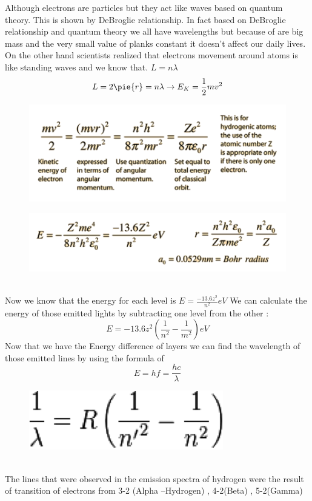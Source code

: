 \documentclass{article}
\begin{document}
Although electrons are particles but they act like waves based on quantum theory. This is shown by DeBroglie relationship. In fact based on DeBroglie relationship and quantum theory we all have wavelengths but because of are big mass and the very small value of planks constant it doesn’t affect our daily lives. \\

On the other hand scientists realized that electrons movement around atoms is like standing waves and we know that. $L=n\lambda$\\
\begin{equation}
    L=2\pie{r}=n\lambda \rightarrow E_{K}=\frac{1}{2}mv^{2}
\end{equation}
\begin{figure}[h!]
    \centering
    \includegraphics{E1.png}
\end{figure}
\begin{figure}[h!]
    \centering
    \includegraphics{E2.png}
\end{figure}\\
Now we know that the energy for each level is $E=\frac{-13.6z^{2}}{n^{2}}eV$ We can calculate the energy of those emitted lights by subtracting one level from the other :\\
\begin{equation}
    E=-13.6z^{2}(\frac{1}{n^{2}}-\frac{1}{m^{2}}) eV
\end{equation}
Now that we have the Energy difference of layers we can find the wavelength of those emitted lines by using the formula of 
\begin{equation}
    E=hf=\frac{hc}{\lambda}
\end{equation}
\begin{figure}[h!]
    \centering
    \includegraphics{E3.png}
\end{figure}\\

The lines that were observed in the emission spectra of hydrogen were the result of transition of electrons from 3-2 (Alpha –Hydrogen) , 4-2(Beta) , 5-2(Gamma) 
\end{document}
